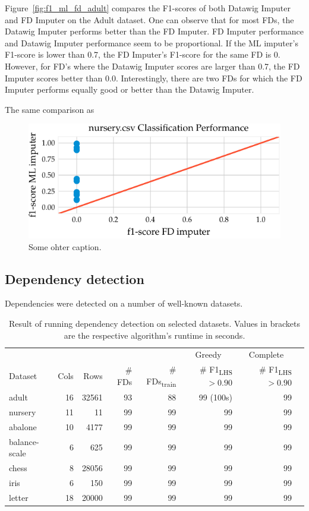 Figure~\ref{fig:f1_ml_fd_adult} compares the F1-scores of both Datawig Imputer and FD Imputer on the Adult dataset.
One can observe that for most FDs, the Datawig Imputer performs better than the FD Imputer.
FD Imputer performance and Datawig Imputer performance seem to be proportional.
If the ML imputer's F1-score is lower than 0.7, the FD Imputer's F1-score for the same FD is 0.
However, for FD's where the Datawig Imputer scores are larger than 0.7, the FD Imputer scores better than 0.0.
Interestingly, there are two FDs for which the FD Imputer performs equally good or better than the Datawig Imputer.

The same comparison as
 \begin{figure}[ht]
     \centering
     \includegraphics[width=.8\textwidth]{../figures/nursery/f1_ml_fd_nursery}
     \caption{Some ohter caption.}
     \label{fig:f1_ml_fd_nursery}
\end{figure}

\subsection{Dependency detection}
Dependencies were detected on a number of well-known datasets.

\begin{table}[ht]
    \centering
    \begin{tabular}{lrrrrrrr}
        \toprule
        & & & & & \multicolumn{1}{c}{Greedy} & \multicolumn{1}{c}{Complete} \\
        Dataset & Cols & Rows & \# FDs & \# FDs\textsubscript{train} & \# F1\textsubscript{LHS} $> 0.90$ & \# F1\textsubscript{LHS} $> 0.90$ \\
        \midrule
        adult & 16 & 32561 & 93 & 88 & 99 (100s)& 99 \\
        nursery & 11 & 11 & 99 & 99 & 99 & 99 \\
        abalone & 10 & 4177 & 99 & 99 & 99 & 99 \\
        balance-scale & 6 & 625 & 99 & 99 & 99 & 99 \\
        chess & 8 & 28056 & 99 & 99 & 99 & 99 \\
        iris & 6 & 150 & 99 & 99 & 99 & 99 \\
        letter & 18 & 20000 & 99 & 99 & 99 & 99 \\
        \bottomrule
    \end{tabular}
    \caption{Result of running dependency detection on selected datasets. Values in brackets are the respective algorithm's runtime in seconds.}\label{tab:dep-detection-performance}
\end{table}
